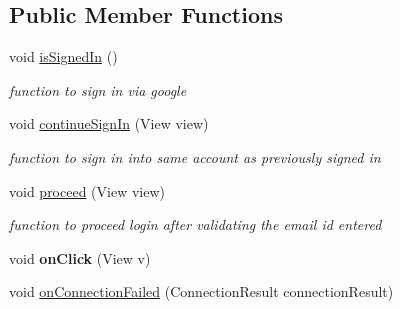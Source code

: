 \subsection*{Public Member Functions}
\begin{DoxyCompactItemize}
\item 
void \hyperlink{classcom_1_1example_1_1sel_1_1lostfound_1_1MainActivity_a55b436bf176e21d22abf837dc8f2602c}{is\+Signed\+In} ()\hypertarget{classcom_1_1example_1_1sel_1_1lostfound_1_1MainActivity_a55b436bf176e21d22abf837dc8f2602c}{}\label{classcom_1_1example_1_1sel_1_1lostfound_1_1MainActivity_a55b436bf176e21d22abf837dc8f2602c}

\begin{DoxyCompactList}\small\item\em function to sign in via google \end{DoxyCompactList}\item 
void \hyperlink{classcom_1_1example_1_1sel_1_1lostfound_1_1MainActivity_af6914b0175f989ccb1c616f05a162f1a}{continue\+Sign\+In} (View view)\hypertarget{classcom_1_1example_1_1sel_1_1lostfound_1_1MainActivity_af6914b0175f989ccb1c616f05a162f1a}{}\label{classcom_1_1example_1_1sel_1_1lostfound_1_1MainActivity_af6914b0175f989ccb1c616f05a162f1a}

\begin{DoxyCompactList}\small\item\em function to sign in into same account as previously signed in \end{DoxyCompactList}\item 
void \hyperlink{classcom_1_1example_1_1sel_1_1lostfound_1_1MainActivity_a4618c5d451d4e0c2ce4562499a583ee5}{proceed} (View view)\hypertarget{classcom_1_1example_1_1sel_1_1lostfound_1_1MainActivity_a4618c5d451d4e0c2ce4562499a583ee5}{}\label{classcom_1_1example_1_1sel_1_1lostfound_1_1MainActivity_a4618c5d451d4e0c2ce4562499a583ee5}

\begin{DoxyCompactList}\small\item\em function to proceed login after validating the email id entered \end{DoxyCompactList}\item 
void {\bfseries on\+Click} (View v)\hypertarget{classcom_1_1example_1_1sel_1_1lostfound_1_1MainActivity_ac979afc8333ca7e81e7859cd383c614d}{}\label{classcom_1_1example_1_1sel_1_1lostfound_1_1MainActivity_ac979afc8333ca7e81e7859cd383c614d}

\item 
void \hyperlink{classcom_1_1example_1_1sel_1_1lostfound_1_1MainActivity_a15df38b4157a1f3a7c9dd7c8099e7495}{on\+Connection\+Failed} (Connection\+Result connection\+Result)\hypertarget{classcom_1_1example_1_1sel_1_1lostfound_1_1MainActivity_a15df38b4157a1f3a7c9dd7c8099e7495}{}\label{classcom_1_1example_1_1sel_1_1lostfound_1_1MainActivity_a15df38b4157a1f3a7c9dd7c8099e7495}


\end{DoxyCompactItemize}
